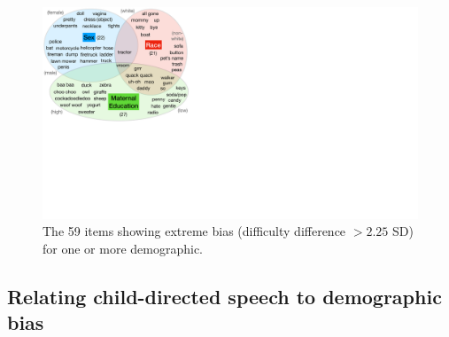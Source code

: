 \documentclass[10pt, letterpaper]{article}
\newenvironment{CodeChunk}{}{}
\begin{document}
\begin{CodeChunk}
\begin{figure}[H]

{\centering \includegraphics[width=\linewidth]{figs/extrema2p25sd} 

}

\caption[The 59 items showing extreme bias (difficulty difference $>2.25$ SD) for one or more demographic]{The 59 items showing extreme bias (difficulty difference $>2.25$ SD) for one or more demographic.}\label{fig:biased-words}
\end{figure}
\end{CodeChunk}

\hypertarget{relating-child-directed-speech-to-demographic-bias}{%
\subsection{Relating child-directed speech to demographic
bias}\label{relating-child-directed-speech-to-demographic-bias}}
\end{document}
